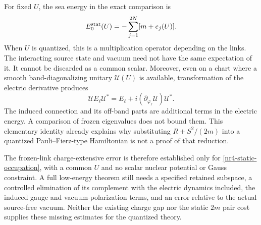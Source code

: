 For fixed $U$, the sea energy in the exact comparison is
\[
 E_0^{\rm stat}(U)=-\sum_{j=1}^{2N}[m+e_j(U)].
\]
When $U$ is quantized, this is a multiplication operator depending on
the links. The interacting source state and vacuum need not have the
same expectation of it. It cannot be discarded as a common scalar.
Moreover, even on a chart where a smooth band-diagonalizing unitary
$\mathcal U(U)$ is available, transformation of the electric derivative
produces
\[
 \mathcal U E_\ell\mathcal U^*
 =E_\ell+i(\partial_{\varphi_\ell}\mathcal U)\mathcal U^*.
\]
The induced connection and its off-band parts are additional terms in
the electric energy. A comparison of frozen eigenvalues does not bound
them. This elementary identity already explains why substituting
$R+S^2/(2m)$ into a quantized Pauli--Fierz-type Hamiltonian is not a
proof of that reduction.

The frozen-link charge-extensive error is therefore established only
for \eqref{nr4-static-occupation}, with a common $U$ and no scalar nuclear
potential or Gauss constraint. A full low-energy theorem still needs
a specified retained subspace, a controlled elimination of its
complement with the electric dynamics included, the induced gauge and
vacuum-polarization terms, and an error relative to the actual source-free
vacuum. Neither the existing charge gap nor the static $2m$ pair cost
supplies these missing estimates for the quantized theory.
